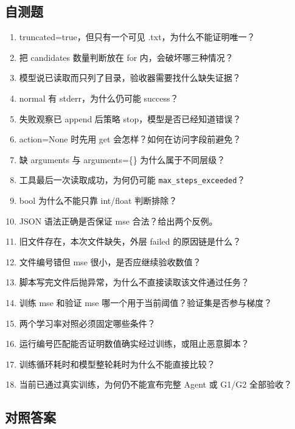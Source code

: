 \subsection{自测题}

\begin{enumerate}
\item truncated=true，但只有一个可见 .txt，为什么不能证明唯一？
\item 把 candidates 数量判断放在 for 内，会破坏哪三种情况？
\item 模型说已读取而只列了目录，验收器需要找什么缺失证据？
\item normal 有 stderr，为什么仍可能 success？
\item 失败观察已 append 后策略 stop，模型是否已经知道错误？
\item action=None 时先用 get 会怎样？如何在访问字段前避免？
\item 缺 arguments 与 arguments=\{\} 为什么属于不同层级？
\item 工具最后一次读取成功，为何仍可能 \nolinkurl{max_steps_exceeded}？
\item bool 为什么不能只靠 int/float 判断排除？
\item JSON 语法正确是否保证 mse 合法？给出两个反例。
\item 旧文件存在，本次文件缺失，外层 failed 的原因链是什么？
\item 文件编号错但 mse 很小，是否应继续验收数值？
\item 脚本写完文件后抛异常，为什么不直接读取该文件通过任务？
\item 训练 mse 和验证 mse 哪一个用于当前阈值？验证集是否参与梯度？
\item 两个学习率对照必须固定哪些条件？
\item 运行编号匹配能否证明数值确实经过训练，或阻止恶意脚本？
\item 训练循环耗时和模型整轮耗时为什么不能直接比较？
\item 当前已通过真实训练，为何仍不能宣布完整 Agent 或 G1/G2 全部验收？
\end{enumerate}

\subsection{对照答案}

